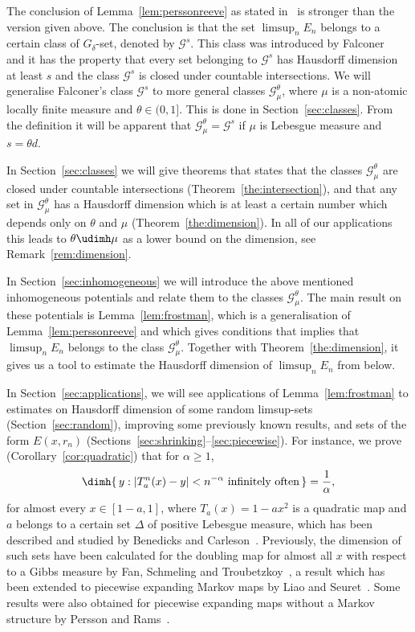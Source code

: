 The conclusion of Lemma~\ref{lem:perssonreeve} as stated in~\cite{perssonreeve} is stronger than the version given above. The conclusion is that the set $\limsup_n E_n$ belongs to a certain class of $G_\delta$-set, denoted by $\mathscr{G}^s$. This class was introduced by Falconer~\cite{falconer1, falconer2} and it has the property that every set belonging to $\mathscr{G}^s$ has Hausdorff dimension at least $s$ and the class $\mathscr{G}^s$ is closed under countable intersections. We will generalise Falconer's class $\mathscr{G}^s$ to more general classes $\mathscr{G}_\mu^\theta$, where $\mu$ is a non-atomic locally finite measure and $\theta \in (0,1]$. This is done in Section~\ref{sec:classes}. From the definition it will be apparent that $\mathscr{G}_\mu^\theta =
\mathscr{G}^s$ if $\mu$ is Lebesgue measure and $s = \theta d$.

In Section~\ref{sec:classes} we will give theorems that states that the classes $\mathscr{G}_\mu^\theta$ are closed under countable intersections (Theorem~\ref{the:intersection}), and that any set in $\mathscr{G}_\mu^\theta$ has a Hausdorff dimension which is at least a certain number which depends only on $\theta$ and $\mu$ (Theorem~\ref{the:dimension}). In all of our applications this leads to $\theta \udimh \mu$ as a lower bound on the dimension, see Remark~\ref{rem:dimension}.

In Section~\ref{sec:inhomogeneous} we will introduce the above mentioned inhomogeneous potentials and relate them to the classes $\mathscr{G}_\mu^\theta$. The main result on these potentials is Lemma~\ref{lem:frostman}, which is a generalisation of Lemma~\ref{lem:perssonreeve} and which gives conditions that implies that $\limsup_n E_n$ belongs to the class $\mathscr{G}_\mu^\theta$. Together with Theorem~\ref{the:dimension}, it gives us a tool to estimate the Hausdorff dimension of $\limsup_n E_n$ from below.

In Section~\ref{sec:applications}, we will see applications of Lemma~\ref{lem:frostman} to estimates on Hausdorff dimension of some random limsup-sets (Section~\ref{sec:random}), improving some previously known results, and sets of the form $E(x,r_n)$ (Sections~\ref{sec:shrinking}--\ref{sec:piecewise}). For instance, we prove (Corollary~\ref{cor:quadratic}) that for $\alpha \geq 1$,
\[
\dimh \{ \, y : | T_a^n (x) - y| < n^{-\alpha} \text{ infinitely often} \, \} = \frac{1}{\alpha},
\]
for almost every $x \in [1-a, 1]$, where $T_a (x) = 1 - a x^2$ is a quadratic map and $a$ belongs to a certain set $\Delta$ of positive Lebesgue measure, which has been described and studied by Benedicks and Carleson~\cite{benedickscarleson}. Previously, the dimension of such sets have been calculated for the doubling map for almost all $x$ with respect to a Gibbs measure by Fan, Schmeling and Troubetzkoy~\cite{fanschmelingtroubetzkoy}, a result which has been extended to piecewise expanding Markov maps by Liao and Seuret~\cite{liaoseuret}. Some results were also obtained for piecewise expanding maps without a Markov structure by Persson and Rams~\cite{perssonrams}.

